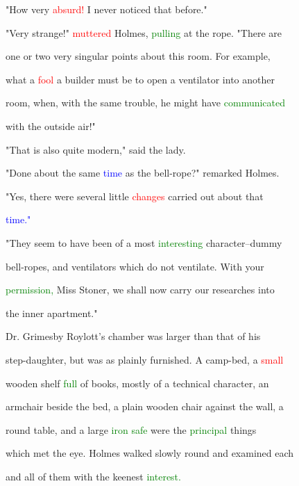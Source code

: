  "How very \textcolor{red}{absurd!} I never noticed that before."



 "Very strange!" \textcolor{red}{muttered} Holmes, \textcolor{green}{pulling} at the rope. "There are

 one or two very singular points about this room. For example,

 what a \textcolor{red}{fool} a builder must be to open a ventilator into another

 room, when, with the same trouble, he might have \textcolor{green}{communicated}

 with the outside air!"



 "That is also quite modern," said the lady.



 "Done about the same \textcolor{blue}{time} as the bell-rope?" remarked Holmes.



 "Yes, there were several little \textcolor{red}{changes} carried out about that

 \textcolor{blue}{time."}



 "They seem to have been of a most \textcolor{green}{interesting} character--dummy

 bell-ropes, and ventilators which do not ventilate. With your

 \textcolor{green}{permission,} Miss Stoner, we shall now carry our researches into

 the inner apartment."



 Dr. Grimesby Roylott's chamber was larger than that of his

 step-daughter, but was as plainly furnished. A camp-bed, a \textcolor{red}{small}

 wooden shelf \textcolor{green}{full} of books, mostly of a technical character, an

 armchair beside the bed, a plain wooden chair against the wall, a

 round table, and a large \textcolor{green}{iron} \textcolor{green}{safe} were the \textcolor{green}{principal} things

 which met the eye. Holmes walked slowly round and examined each

 and all of them with the keenest \textcolor{green}{interest.}



